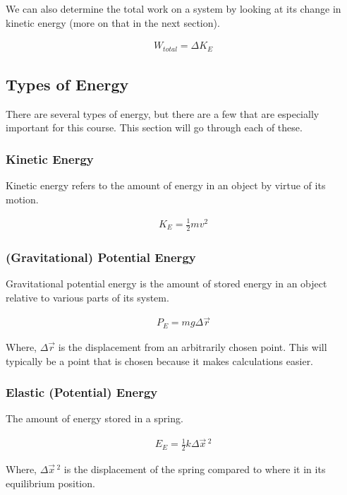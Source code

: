 \documentclass{article}
\begin{document}
We can also determine the total work on a system by looking at its
change in kinetic energy (more on that in the next section).

\begin{eqnarray}
    W_{total} = \Delta K_E
\end{eqnarray}

\subsection{Types of Energy}
There are several types of energy, but there are a few that are especially
important for this course. This section will go through each of these.

\subsubsection{Kinetic Energy}
Kinetic energy refers to the amount of energy in an object by
virtue of its motion.

\begin{eqnarray}
    K_E = \frac{1}{2}mv^2
\end{eqnarray}

\subsubsection{(Gravitational) Potential Energy}
Gravitational potential energy is the amount of stored energy in an
object relative to various parts of its system.

\begin{eqnarray}
    P_E = mg \Delta \vec{r}
\end{eqnarray}

\noindent Where, $\Delta \vec{r}$ is the displacement from an arbitrarily
chosen point. This will typically be a point that is chosen because it makes
calculations easier.

\subsubsection{Elastic (Potential) Energy}
The amount of energy stored in a spring.

\begin{eqnarray}
    E_E = \frac{1}{2} k \Delta \vec{x} \, ^2
\end{eqnarray}

\noindent Where, $\Delta \vec{x} \, ^2$ is the displacement of the spring
compared to where it in its equilibrium position.
\end{document}
